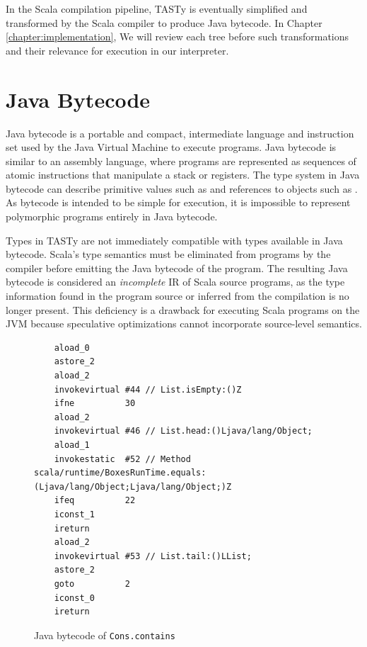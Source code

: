 In the Scala compilation pipeline, TASTy is eventually simplified and transformed by the Scala compiler to produce Java bytecode. 
In Chapter \ref{chapter:implementation}, We will review each tree before such transformations and their relevance for execution in our interpreter.

\section{Java Bytecode}

Java bytecode is a portable and compact, intermediate language and instruction set used by the Java Virtual Machine to execute programs.
Java bytecode is similar to an assembly language, where programs are represented as sequences of atomic instructions that manipulate a stack or registers.
The type system in Java bytecode can describe primitive values such as  and references to objects such as .
As bytecode is intended to be simple for execution, it is impossible to represent polymorphic programs entirely in Java bytecode.

Types in TASTy are not immediately compatible with types available in Java bytecode.
Scala's type semantics must be eliminated from programs by the compiler before emitting the Java bytecode of the program.
The resulting Java bytecode is considered an \textit{incomplete} IR of Scala source programs, as the type information found in the program source or inferred from the compilation is no longer present.
This deficiency is a drawback for executing Scala programs on the JVM because speculative optimizations cannot incorporate source-level semantics.

\begin{figure}[!htb]
	\begin{verbatim}
	aload_0
 	astore_2
	aload_2
	invokevirtual #44 // List.isEmpty:()Z
	ifne          30
	aload_2
	invokevirtual #46 // List.head:()Ljava/lang/Object;
	aload_1
	invokestatic  #52 // Method scala/runtime/BoxesRunTime.equals:(Ljava/lang/Object;Ljava/lang/Object;)Z
	ifeq          22
	iconst_1
	ireturn
	aload_2
	invokevirtual #53 // List.tail:()LList;
	astore_2
	goto          2
	iconst_0
	ireturn
	\end{verbatim}
	\caption{Java bytecode of \texttt{Cons.contains}}
	\label{example:contains-bytecode}
\end{figure}

